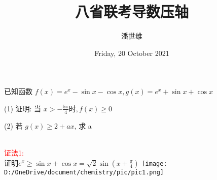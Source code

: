 \documentclass[a4paper,12pt]{article}
\begin{document}
\title {八省联考导数压轴}
\author{潘世维}
\date{Friday, 20 October 2021}
\maketitle

已知函数 $ f(x)=e^{x}-\sin x-\cos x, g(x)=e^{x}+\sin x+\cos x$


(1) 证明: 当 $ x>-\frac{5 \pi}{4}  时,  f(x) \geq 0 $



(2) 若 $ g(x) \geq 2+a x $, 求  a 
\begin{flushleft}
~\\
\textcolor{red}{证法1:}\\
证明$e^x \ge \sin x + \cos x = \sqrt 2 \sin \left( x + \frac{\pi }{4} \right) $
\texttt{[image: D:/OneDrive/document/chemistry/pic/pic1.png]}

\end{flushleft}
\end{document}

